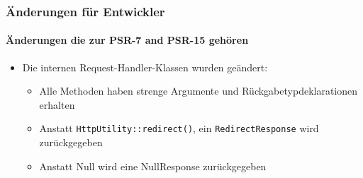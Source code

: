 \begin{frame}[fragile]
	\frametitle{Änderungen für Entwickler}
	\framesubtitle{Änderungen die zur PSR-7 and PSR-15 gehören}

	\lstset{basicstyle=\tiny\ttfamily}

	\begin{itemize}
		\item Die internen Request-Handler-Klassen wurden geändert:

		\begin{itemize}
			\item Alle Methoden haben strenge Argumente und Rückgabetypdeklarationen erhalten
			\item Anstatt \texttt{HttpUtility::redirect()},\newline
				ein \texttt{RedirectResponse} wird zurückgegeben
			\item Anstatt Null wird eine NullResponse zurückgegeben
		\end{itemize}

	\end{itemize}

\end{frame}


